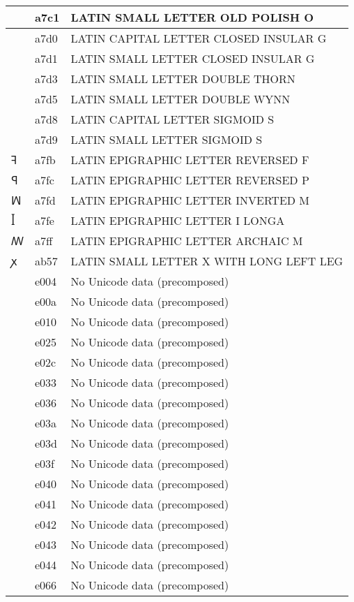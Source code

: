 \documentclass[12pt,letterpaper,openany]{book}
\begin{document}
\begin{center}
\begin{supertabular}{|m{0.25in}|m{0.5in}|m{4in}|}
ꟁ & a7c1 & LATIN SMALL LETTER OLD POLISH O\\\hline
Ꟑ & a7d0 & LATIN CAPITAL LETTER CLOSED INSULAR G\\\hline
ꟑ & a7d1 & LATIN SMALL LETTER CLOSED INSULAR G\\\hline
ꟓ & a7d3 & LATIN SMALL LETTER DOUBLE THORN\\\hline
ꟕ & a7d5 & LATIN SMALL LETTER DOUBLE WYNN\\\hline
Ꟙ & a7d8 & LATIN CAPITAL LETTER SIGMOID S\\\hline
ꟙ & a7d9 & LATIN SMALL LETTER SIGMOID S\\\hline
ꟻ & a7fb & LATIN EPIGRAPHIC LETTER REVERSED F\\\hline
ꟼ & a7fc & LATIN EPIGRAPHIC LETTER REVERSED P\\\hline
ꟽ & a7fd & LATIN EPIGRAPHIC LETTER INVERTED M\\\hline
ꟾ & a7fe & LATIN EPIGRAPHIC LETTER I LONGA\\\hline
ꟿ & a7ff & LATIN EPIGRAPHIC LETTER ARCHAIC M\\\hline
ꭗ & ab57 & LATIN SMALL LETTER X WITH LONG LEFT LEG\\\hline
 & e004 & No Unicode data (precomposed)\\\hline
 & e00a & No Unicode data (precomposed)\\\hline
 & e010 & No Unicode data (precomposed)\\\hline
 & e025 & No Unicode data (precomposed)\\\hline
 & e02c & No Unicode data (precomposed)\\\hline
 & e033 & No Unicode data (precomposed)\\\hline
 & e036 & No Unicode data (precomposed)\\\hline
 & e03a & No Unicode data (precomposed)\\\hline
 & e03d & No Unicode data (precomposed)\\\hline
 & e03f & No Unicode data (precomposed)\\\hline
 & e040 & No Unicode data (precomposed)\\\hline
 & e041 & No Unicode data (precomposed)\\\hline
 & e042 & No Unicode data (precomposed)\\\hline
 & e043 & No Unicode data (precomposed)\\\hline
 & e044 & No Unicode data (precomposed)\\\hline
 & e066 & No Unicode data (precomposed)\\\hline

\end{supertabular}
\end{center}
\end{document}
